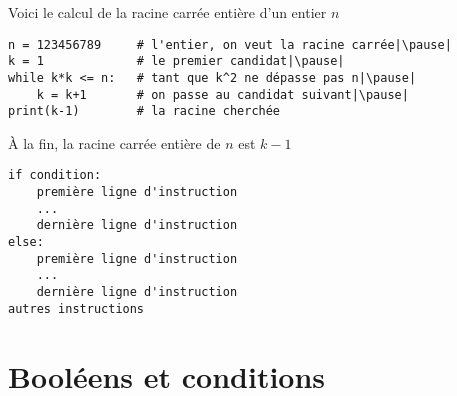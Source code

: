 \begin{frame}[fragile]

Voici le calcul de la racine carrée entière d'un entier $n$ 
\medskip
\pause

\begin{algo}
\begin{lstlisting}
n = 123456789     # l'entier, on veut la racine carrée|\pause|
k = 1             # le premier candidat|\pause|
while k*k <= n:   # tant que k^2 ne dépasse pas n|\pause|
    k = k+1       # on passe au candidat suivant|\pause|
print(k-1)        # la racine cherchée    
\end{lstlisting}
\end{algo}

\medskip
\pause
\`A la fin, la racine carrée entière de $n$ est $k-1$

\end{frame}


\begin{frame}[fragile]

 
 \medskip
 \pause
 
\begin{algo}
\begin{lstlisting}
if condition:
    première ligne d'instruction
    ...
    dernière ligne d'instruction
else:
    première ligne d'instruction
    ...
    dernière ligne d'instruction
autres instructions
\end{lstlisting}
\end{algo}

\end{frame}




\section{Booléens et conditions}

